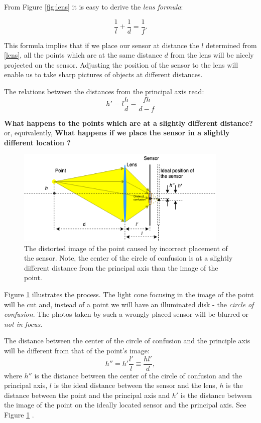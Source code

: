 \documentclass[a4paper,10pt]{article}
\begin{document}
From Figure \ref{fig:lens} it is easy to derive the {\it lens formula}:

\begin{equation}
 \frac{1}{l} + \frac{1}{d} = \frac{1}{f}.
 \label{lens}
\end{equation}

This formula implies that if we place our sensor at distance the $l$ determined from \eqref{lens}, all the points which are at the same distance $d$ from the lens will be nicely projected on the sensor. Adjusting the position of the sensor to the lens will enable us to take sharp pictures of objects at different distances. 

The relations between the distances from the principal axis read:
\begin{equation}
h' = l\frac{h}{d}\equiv \frac{fh}{d-f}
\end{equation} 


{\bf What happens to the points which are at a slightly different distance?} or, equivalently,  {\bf What happens if we place the sensor in a slightly different location ?}

\begin{figure}[h]
\centering
 \includegraphics[width=0.9\textwidth]{../../images/lens_confusion_circle.png}
 \caption{The distorted image of the point caused by incorrect placement of the sensor. Note, the center of the circle of confusion is at a slightly different distance from the principal axis than the image of the point.}
 \label{fig:lens_cconf}
\end{figure}

Figure \ref{fig:lens_cconf} illustrates the process. The light cone focusing in the image of the point will be cut and, instead of a point we will have an illuminated disk - the {\it circle of confusion}. The photos taken by such a wrongly placed sensor will be blurred or {\it not in focus}. 

The distance between the center of the circle of confusion and the principle axis will be different from that of the point's image:
\begin{equation}
h'' = h'\frac{l'}{l} \equiv \frac{hl'}{d},
\label{dcirc}
\end{equation} 
where $h''$ is the distance between the center of the circle of confusion and the principal axis, $l$ is the ideal distance between the sensor and the lens, $h$ is the distance between the point and the principal axis and $h'$ is the distance between the image of the point on the ideally located sensor and the principal axis. See Figure \ref{fig:lens_cconf} .
\end{document}
